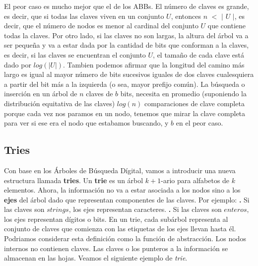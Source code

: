 \documentclass[10pt,a4paper]{article}
\begin{document}
El peor caso es mucho mejor que el de los ABBs. El número de claves es grande, es decir, que si todas las claves viven en un conjunto $U$, entonces $n$ $<$ $|$ $U$ $|$, es decir, que el número de nodos es menor al cardinal del conjunto $U$ que contiene todas la claves. Por otro lado, si las claves no son largas, la altura del árbol va a ser pequeña y va a estar dada por la cantidad de bits que conforman a la claves, es decir, si las claves se encuentran el conjunto $U$, el tamaño de cada clave está dado por $log(|U|)$. 
\newline
\newline
Tambien podemos afirmar que la longitud del camino más largo es igual al mayor número de bits sucesivos iguales de dos claves cualesquiera a partir del bit más a la izquierda (o sea, mayor prefijo común).
\newline
\newline
La búsqueda o inserción en un árbol de $n$ claves de $b$ bits, necesita en promedio (suponiendo la distribución equitativa de las claves) $log(n)$ comparaciones de clave completa porque cada vez nos paramos en un nodo, tenemos que mirar la clave completa para ver si ese era el nodo que estabamos buscando, y $b$ en el peor caso.
\newpage

\subsection{Tries}

Con base en los Árboles de Búsqueda Dígital, vamos a introducir una nueva estructura llamada \textbf{tries}.
\newline
\newline
Un \textbf{trie} es un árbol $k+1$-ario para alfabetos de $k$ elementos.
\newline
\newline
Ahora, la información no va a estar asociada a los nodos sino a los \textbf{ejes} del árbol dado que representan componentes de las claves.
\newline
\newline
Por ejemplo:
\newline
\newline
\textbf{.} Si las claves son $strings$, los ejes representan caracteres.
\newline
\newline
\textbf{.} Si las claves son $enteros$, los ejes representan dígitos o bits.
\newline
\newline
En un trie, cada subárbol representa al conjunto de claves que comienza con las etiquetas de los ejes llevan hasta él. Podriamos considerar esta definición como la función de abstracción.
\newline
\newline
Los nodos internos no contienen claves.
\newline
\newline
Las claves o los punteros a la información se almacenan en las hojas.
\newline
\newline
Veamos el siguiente ejemplo de \textit{trie}.
\end{document}
